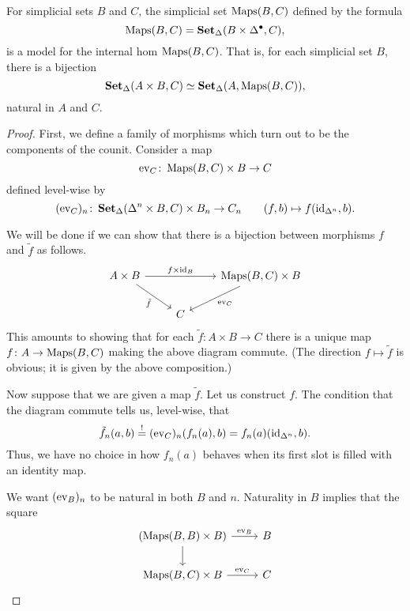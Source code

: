 \documentclass[main.tex]{subfiles}
\begin{document}
\begin{theorem}
  For simplicial sets $B$ and $C$, the simplicial set $\operatorname{Maps}(B, C)$ defined by the formula
  \begin{equation*}
    \operatorname{Maps}(B, C) = \operatorname{\mathbf{Set}_{\Delta}}(B \times \Delta^{\bullet}, C),
  \end{equation*}
  is a model for the internal hom $\operatorname{Maps}(B, C)$. That is, for each simplicial set $B$, there is a bijection
  \begin{equation*}
    \operatorname{\mathbf{Set}_{\Delta}}(A \times B, C) \simeq \operatorname{\mathbf{Set}_{\Delta}}(A, \operatorname{Maps}(B, C)),
  \end{equation*}
  natural in $A$ and $C$.
\end{theorem}
\begin{proof}
  First, we define a family of morphisms which turn out to be the components of the counit. Consider a map
  \begin{equation*}
    \mathrm{ev}_{C}\colon \operatorname{Maps}(B, C) \times B \to C
  \end{equation*}
  defined level-wise by
  \begin{equation*}
    (\mathrm{ev}_{C})_{n}\colon \operatorname{\mathbf{Set}_{\Delta}}(\Delta^{n} \times B, C) \times B_{n} \to C_{n}\qquad (f, b) \mapsto f(\mathrm{id}_{\Delta^{n}}, b).
  \end{equation*}

  We will be done if we can show that there is a bijection between morphisms $f$ and $\tilde{f}$ as follows.
  \begin{equation*}
    \begin{tikzcd}
      A \times B
      \arrow[rr, "f \times \id_{B}"]
      \arrow[dr, swap, "\tilde{f}"]
      && \Maps(B, C) \times B
      \arrow[dl, "\mathrm{ev}_{C}"]
      \\
      & C
    \end{tikzcd}
  \end{equation*}
  This amounts to showing that for each $\tilde{f}\colon A \times B \to C$ there is a unique map $f\colon A \to \operatorname{Maps}(B, C)$ making the above diagram commute. (The direction $f \mapsto \tilde{f}$ is obvious; it is given by the above composition.)

  Now suppose that we are given a map $\tilde{f}$. Let us construct $f$. The condition that the diagram commute tells us, level-wise, that
  \begin{equation*}
    \tilde{f}_{n}(a, b) \overset{!}{=} (\mathrm{ev}_{C})_{n}(f_{n}(a), b) = f_{n}(a)(\mathrm{id}_{\Delta^{n}}, b).
  \end{equation*}
  Thus, we have no choice in how $f_{n}(a)$ behaves when its first slot is filled with an identity map.

  We want $(\mathrm{ev}_{B})_{n}$ to be natural in both $B$ and $n$. Naturality in $B$ implies that the square
  \begin{equation*}
    \begin{tikzcd}
      (\Maps(B, B) \times B)
      \arrow[r, "\ev_{B}"]
      \arrow[d]
      & B
      \\
      \Maps(B, C) \times B
      \arrow[r, "\ev_{C}"]
      & C
    \end{tikzcd}
  \end{equation*}
\end{proof}
\end{document}
